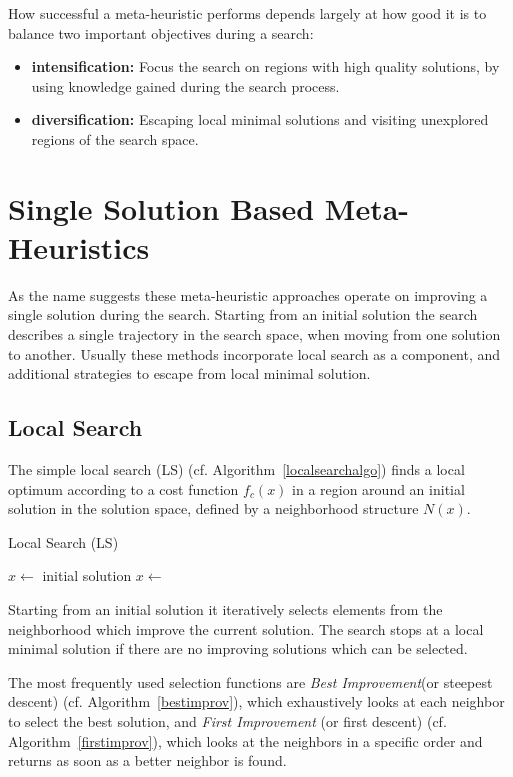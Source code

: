 How successful a meta-heuristic performs depends largely at how good it is to balance two important objectives during a search:
\begin{itemize}
\item{\bf{intensification:}} Focus the search on regions with high quality solutions, by using knowledge gained during the search process.
\item{\bf{diversification:}} Escaping local minimal solutions and visiting unexplored regions of the search space.
\end{itemize}

 
\section{Single Solution Based Meta-Heuristics}\label{sec:single}
As the name suggests these meta-heuristic approaches operate on improving a single solution during the search. 
Starting from an initial solution the search describes a single trajectory in the search space, when moving from one solution to another. 
Usually these methods incorporate local search as a component, and additional strategies to escape from local minimal solution.  

\subsection{Local Search}\label{sec:ls}
The simple local search (LS) (cf. Algorithm~\ref{localsearchalgo}) finds a local optimum according to a cost function $f_c(x)$ in a region around an initial solution in the solution space, defined by a neighborhood structure $N(x)$. 

\begin{algorithm}
\caption{Local Search  (LS)}
\label{localsearchalgo}
\begin{algorithmic}[1] 
\State $x\gets$ initial solution
\Repeat
\State $x\gets$ 
\end{algorithmic}
\end{algorithm}

Starting from an initial solution it iteratively selects elements from the neighborhood which improve the current solution. 
The search stops at a local minimal solution if there are no improving solutions which can be selected.

The most frequently used selection functions are \emph{Best Improvement}(or steepest descent) (cf. Algorithm~\ref{bestimprov}), which exhaustively looks at each neighbor to select the best solution, and \emph{First Improvement} (or first descent) (cf. Algorithm~\ref{firstimprov}), which looks at the neighbors in a specific order and returns as soon as a better neighbor is found. 

